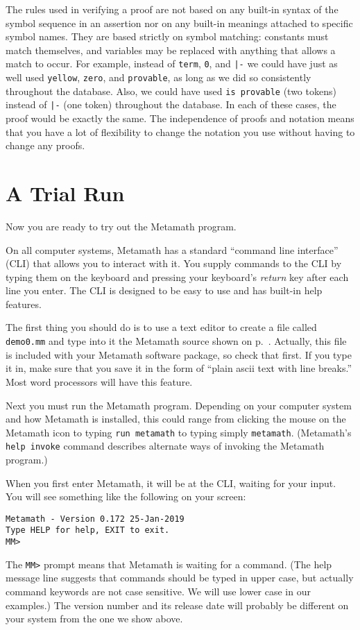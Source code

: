 The rules used in verifying a proof are not based on any built-in syntax of the
symbol sequence in an assertion nor on any built-in meanings
attached to specific symbol names.  They are based strictly on symbol
matching:  constants must match themselves, and
variables may be replaced with anything that allows a match to
occur.  For example, instead of \texttt{term}, \texttt{0}, and \verb$|-$ we could
have just as well used \texttt{yellow}, \texttt{zero}, and \texttt{provable}, as long
as we did so consistently throughout the database.  Also, we could have used
\texttt{is provable} (two tokens) instead of \verb$|-$ (one token) throughout the
database.  In each of these cases, the proof would be exactly the same.  The
independence of proofs and notation means that you have a lot of flexibility to
change the notation you use without having to change any proofs.

\section{A Trial Run}\label{trialrun}

Now you are ready to try out the Metamath program.

On all computer systems, Metamath has a standard ``command line
interface'' (CLI) that allows you to
interact with it.  You supply commands to the CLI by typing them on the
keyboard and pressing your keyboard's {\em return} key after each line
you enter.  The CLI is designed to be easy to use and has built-in help
features.

The first thing you should do is to use a text editor to create a file
called \texttt{demo0.mm} and type into it the Metamath source shown on
p.~\pageref{demo0}.  Actually, this file is included with your Metamath
software package, so check that first.  If you type it in, make sure
that you save it in the form of ``plain {\sc ascii} text with line
breaks.''  Most word processors will have this feature.

Next you must run the Metamath program.  Depending on your computer
system and how Metamath is installed, this could range from clicking the
mouse on the Metamath icon to typing \texttt{run metamath} to typing
simply \texttt{metamath}.  (Metamath's {\tt help invoke} command describes
alternate ways of invoking the Metamath program.)

When you first enter Metamath, it will be at the CLI, waiting
for your input. You will see something like the following on your screen:
\begin{verbatim}
Metamath - Version 0.172 25-Jan-2019
Type HELP for help, EXIT to exit.
MM>
\end{verbatim}
The \texttt{MM>} prompt means that Metamath is waiting for a command.
(The help message line suggests that commands should be typed in upper
case, but actually command keywords are not case
sensitive.  We will use lower case in our examples.)
The version number and its release date will probably be different on your
system from the one we show above.

